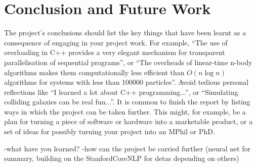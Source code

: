 \chapter{Conclusion and Future Work}

The project's conclusions should list the key things that have been learnt as a consequence of engaging in your project work. For example, ``The use of overloading in C++ provides a very elegant mechanism for transparent parallelisation of sequential programs'', or ``The overheads of linear-time n-body algorithms makes them computationally less efficient than $O(n \log n)$ algorithms for systems with less than 100000 particles''. Avoid tedious personal reflections like ``I learned a lot about C++ programming...'', or ``Simulating colliding galaxies can be real fun...''. It is common to finish the report by listing ways in which the project can be taken further. This might, for example, be a plan for turning a piece of software or hardware into a marketable product, or a set of ideas for possibly turning your project into an MPhil or PhD.

-what have you learned?
-how can the project be carried further (neural net for summary, building on the StanfordCoreNLP for detas depending on others)